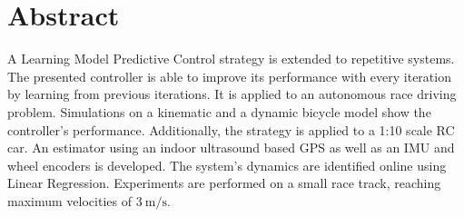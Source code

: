 \documentclass[10pt,twoside,a4paper,fleqn]{report}
\begin{document}
\chapter*{Abstract}
A Learning Model Predictive Control strategy is extended to repetitive systems. The presented controller is able to improve its performance with every iteration by learning from previous iterations. It is applied to an autonomous race driving problem. Simulations on a kinematic and a dynamic bicycle model show the controller's performance. Additionally, the strategy is applied to a 1:10 scale RC car. An estimator using an indoor ultrasound based GPS as well as an IMU and wheel encoders is developed. The system's dynamics are identified online using Linear Regression.
Experiments are performed on a small race track, reaching maximum velocities of $\SI{3}{\meter\per\second}$.

\cleardoublepage


\cleardoublepage


\pagestyle{fancy}               	%


\cleardoublepage

\cleardoublepage

\cleardoublepage


\cleardoublepage





\end{document}
